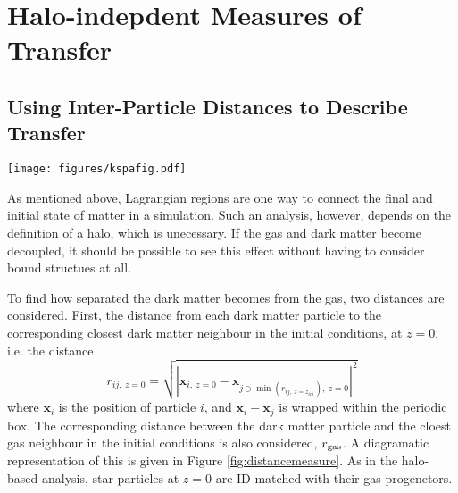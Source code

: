 \section{Halo-indepdent Measures of Transfer}
\label{sec:haloindependent}

\subsection{Using Inter-Particle Distances to Describe Transfer}

\begin{figure*} \centering
	\texttt{[image: figures/kspafig.pdf]} \caption{A
	diagramatic representation of the distance measure. On the left, the
	initial conditions are shown. The blue dark matter particles each find
	their closest dark matter and gas (red) neighbour. These particles are
	then tracked to the final state of the simulation (right) and the
	distances between them calculated again. } \label{fig:distancemeasure}
\end{figure*}

As mentioned above, Lagrangian regions are one way to connect the final and
initial state of matter in a simulation. Such an analysis, however, depends on
the definition of a halo, which is unecessary. If the gas and dark matter
become decoupled, it should be possible to see this effect without having to
consider bound structues at all.

To find how separated the dark matter becomes from the gas, two distances are
considered. First, the distance from each dark matter particle to the
corresponding closest dark matter neighbour in the initial conditions, at
$z=0$, i.e. the distance \begin{equation} r_{ij, ~z=0} = \sqrt{ \left|
\mathbf{x}_{i, ~z=0} - \mathbf{x}_{j \ni \min(r_{ij, ~z=z_{ini}}), ~z=0}
\right|^2 } \label{eqn:minimal} \end{equation} where $\mathbf{x}_i$ is the
position of particle $i$, and $\mathbf{x}_i - \mathbf{x}_j$ is wrapped within
the periodic box. The corresponding distance between the dark matter particle
and the cloest gas neighbour in the initial conditions is also considered,
$r_{\rm gas}$. A diagramatic representation of this is given in Figure
\ref{fig:distancemeasure}. As in the halo-based analysis, star particles at
$z=0$ are ID matched with their gas progenetors.

